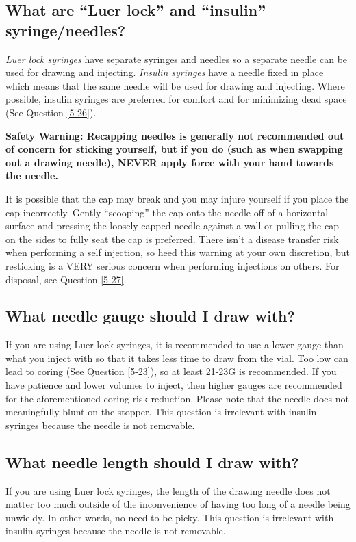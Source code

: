 \documentclass{article}
\begin{document}
{{\subsection{What are “Luer lock” and “insulin” syringe/needles?}\label{5-13}

\textit{Luer lock syringes} have separate syringes and needles so a separate needle can be used for drawing and injecting. \textit{Insulin syringes} have a needle fixed in place which means that the same needle will be used for drawing and injecting. Where possible, insulin syringes are preferred for comfort and for minimizing dead space (See Question \ref{5-26}).

\textbf{Safety Warning: Recapping needles is generally not recommended out of concern for sticking yourself, but if you do (such as when swapping out a drawing needle), NEVER apply force with your hand towards the needle.}

It is possible that the cap may break and you may injure yourself if you place the cap incorrectly. Gently “scooping” the cap onto the needle off of a horizontal surface and pressing the loosely capped needle against a wall or pulling the cap on the sides to fully seat the cap is preferred. There isn't a disease transfer risk when performing a self injection, so heed this warning at your own discretion, but resticking is a VERY serious concern when performing injections on others. For disposal, see Question \ref{5-27}.

\subsection{What needle gauge should I draw with?}

If you are using Luer lock syringes, it is recommended to use a lower gauge than what you inject with so that it takes less time to draw from the vial. Too low can lead to coring (See Question \ref{5-23}), so at least 21-23G is recommended. If you have patience and lower volumes to inject, then higher gauges are recommended for the aforementioned coring risk reduction. Please note that the needle does not meaningfully blunt on the stopper. This question is irrelevant with insulin syringes because the needle is not removable.

\subsection{What needle length should I draw with?}

If you are using Luer lock syringes, the length of the drawing needle does not matter too much outside of the inconvenience of having too long of a needle being unwieldy. In other words, no need to be picky. This question is irrelevant with insulin syringes because the needle is not removable.

}}
\end{document}
